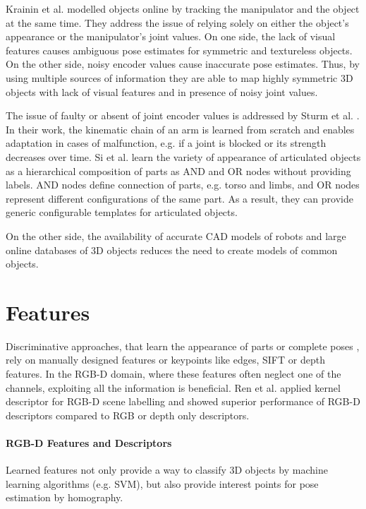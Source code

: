 Krainin et al. \cite{Krainin2011} modelled objects online by tracking the manipulator and the object at the same time.
They address the issue of relying solely on either the object's appearance or the manipulator's joint values. On one side, the lack of visual features causes ambiguous pose estimates for symmetric and textureless objects. On the other side, noisy encoder values cause inaccurate pose estimates.
Thus, by using multiple sources of information they are able to map highly symmetric 3D objects with lack of visual features and in presence of noisy joint values.

The issue of faulty or absent of joint encoder values is addressed by Sturm et al. \cite{Sturm2009}. In their work, the kinematic chain of an arm is learned from scratch and enables adaptation in cases of malfunction, e.g. if a joint is blocked or its strength decreases over time.
Si et al. \cite{Si2013} learn the variety of appearance of articulated objects as a hierarchical composition of parts as AND and OR nodes without providing labels. AND nodes define connection of parts, e.g. torso and limbs, and OR nodes represent different configurations of the same part. As a result, they can provide generic configurable templates for articulated objects.

On the other side, the availability of accurate CAD models of robots and large online databases of 3D objects \cite{Firman2016, Singh2014} reduces the need to create models of common objects.

\section{Features}
Discriminative approaches, that learn the appearance of parts \cite{Shotton2013, Krull2015, Pauwels2015} or complete poses \cite{Sharp2015}, rely on manually designed features or keypoints like edges, SIFT \cite{Pauwels2015, Morwald2010} or depth features. In the RGB-D domain, where these features often neglect one of the channels, exploiting all the information is beneficial. Ren et al. \cite{Ren2012} applied kernel descriptor for RGB-D scene labelling and showed superior performance of RGB-D descriptors compared to RGB or depth only descriptors.

\paragraph{RGB-D Features and Descriptors}
Learned features not only provide a way to classify 3D objects by machine learning algorithms (e.g. SVM), but also provide interest points for pose estimation by homography.

